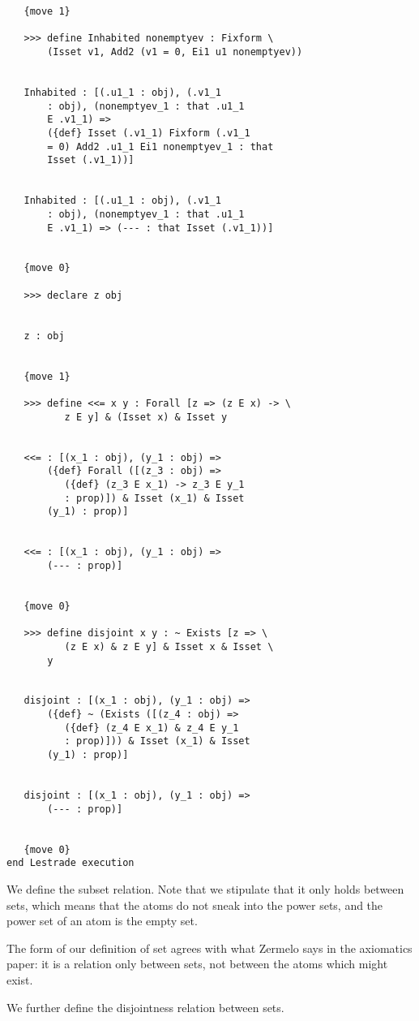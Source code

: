 \documentclass[12pt]{article}
\begin{document}
\begin{verbatim}
   {move 1}

   >>> define Inhabited nonemptyev : Fixform \
       (Isset v1, Add2 (v1 = 0, Ei1 u1 nonemptyev))


   Inhabited : [(.u1_1 : obj), (.v1_1 
       : obj), (nonemptyev_1 : that .u1_1 
       E .v1_1) => 
       ({def} Isset (.v1_1) Fixform (.v1_1 
       = 0) Add2 .u1_1 Ei1 nonemptyev_1 : that 
       Isset (.v1_1))]


   Inhabited : [(.u1_1 : obj), (.v1_1 
       : obj), (nonemptyev_1 : that .u1_1 
       E .v1_1) => (--- : that Isset (.v1_1))]


   {move 0}

   >>> declare z obj


   z : obj


   {move 1}

   >>> define <<= x y : Forall [z => (z E x) -> \
          z E y] & (Isset x) & Isset y


   <<= : [(x_1 : obj), (y_1 : obj) => 
       ({def} Forall ([(z_3 : obj) => 
          ({def} (z_3 E x_1) -> z_3 E y_1 
          : prop)]) & Isset (x_1) & Isset 
       (y_1) : prop)]


   <<= : [(x_1 : obj), (y_1 : obj) => 
       (--- : prop)]


   {move 0}

   >>> define disjoint x y : ~ Exists [z => \
          (z E x) & z E y] & Isset x & Isset \
       y


   disjoint : [(x_1 : obj), (y_1 : obj) => 
       ({def} ~ (Exists ([(z_4 : obj) => 
          ({def} (z_4 E x_1) & z_4 E y_1 
          : prop)])) & Isset (x_1) & Isset 
       (y_1) : prop)]


   disjoint : [(x_1 : obj), (y_1 : obj) => 
       (--- : prop)]


   {move 0}
end Lestrade execution
\end{verbatim}

We define the subset relation.  Note that we stipulate that it only holds between sets, which means that the atoms do not sneak into the power sets,
and the power set of an atom is the empty set.

The form of our definition of set agrees with what Zermelo says in the axiomatics paper:  it is a relation only between sets, not between the atoms which might exist. 

We further define the disjointness relation between sets.
\end{document}
